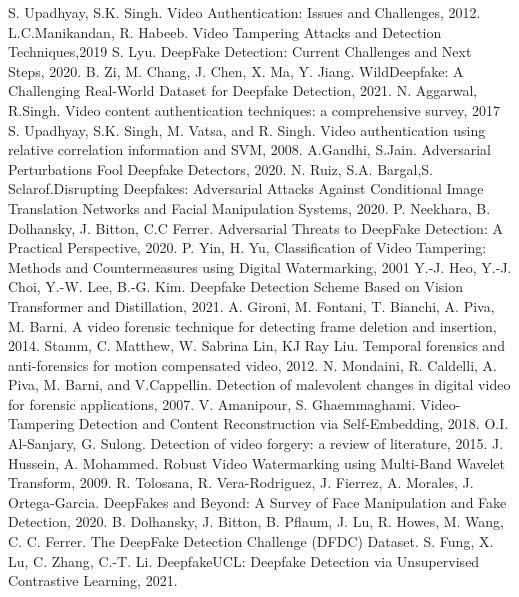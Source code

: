 \documentclass[12pt]{article}
\begin{document}
    \begin{thebibliography}{9}
        S. Upadhyay, S.K. Singh. Video Authentication: Issues and Challenges, 2012.
        L.C.Manikandan, R. Habeeb. Video Tampering Attacks and Detection Techniques,2019
        S. Lyu. DeepFake Detection: Current Challenges and Next Steps, 2020.
        B. Zi, M. Chang, J. Chen, X. Ma, Y. Jiang. WildDeepfake: A Challenging Real-World Dataset for Deepfake Detection, 2021.
        N. Aggarwal, R.Singh. Video content authentication techniques: a comprehensive survey, 2017
        S. Upadhyay, S.K. Singh, M. Vatsa, and R. Singh. Video
        authentication using relative correlation information and SVM, 2008.
        A.Gandhi, S.Jain. Adversarial Perturbations Fool Deepfake Detectors, 2020.
        N. Ruiz, S.A. Bargal,S. Sclarof.Disrupting Deepfakes: Adversarial Attacks
Against Conditional Image Translation
Networks and Facial Manipulation Systems, 2020.
        P. Neekhara, B. Dolhansky, J. Bitton, C.C Ferrer. Adversarial Threats to DeepFake Detection: A Practical Perspective, 2020.
        P. Yin, H. Yu, Classification of Video Tampering: Methods and Countermeasures using Digital Watermarking, 2001
        Y.-J. Heo, Y.-J. Choi, Y.-W. Lee, B.-G. Kim. Deepfake Detection Scheme Based on Vision Transformer and Distillation, 2021.
        A. Gironi, M. Fontani, T. Bianchi, A. Piva, M. Barni. A video forensic technique for detecting frame deletion and insertion, 2014.
        Stamm, C. Matthew, W. Sabrina Lin, KJ Ray Liu. Temporal forensics and anti-forensics
for motion compensated video, 2012.
        N. Mondaini, R. Caldelli, A. Piva, M. Barni, and V.Cappellin. Detection of malevolent changes
in digital video for forensic applications, 2007.
        V. Amanipour, S. Ghaemmaghami. Video-Tampering Detection and Content Reconstruction via Self-Embedding, 2018.
        O.I. Al-Sanjary, G. Sulong. Detection of video forgery: a review of literature, 2015.
        J. Hussein, A. Mohammed. Robust Video Watermarking using Multi-Band
Wavelet Transform, 2009.
        R. Tolosana, R. Vera-Rodriguez, J. Fierrez, A. Morales, J. Ortega-Garcia. DeepFakes and Beyond: A Survey of Face Manipulation and Fake Detection, 2020.
        B. Dolhansky, J. Bitton, B. Pflaum, J. Lu, R. Howes, M. Wang, C. C. Ferrer. The DeepFake Detection Challenge (DFDC) Dataset.
        S. Fung, X. Lu, C. Zhang, C.-T. Li. DeepfakeUCL: Deepfake Detection via
Unsupervised Contrastive Learning, 2021.
        
    \end{thebibliography}





        
\end{document}
